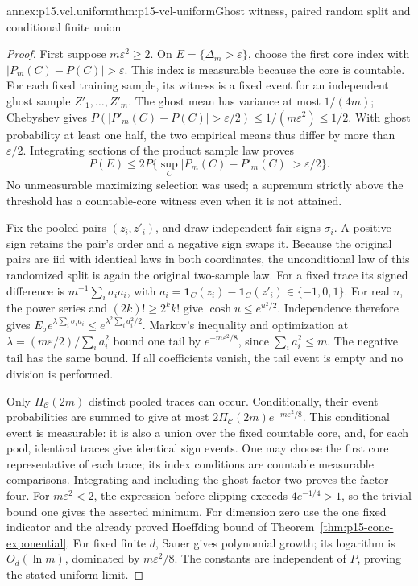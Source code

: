 \begin{annexitem}{annex:p15.vcl.uniform}{thm:p15-vcl-uniform}{Ghost witness, paired random split and conditional finite union}
\begin{proof}
First suppose \(m\varepsilon^2\geq2\). On
\(E=\{\Delta_m>\varepsilon\}\), choose the first core index with
\(|P_m(C)-P(C)|>\varepsilon\). This index is measurable because the
core is countable. For each fixed training sample, its witness is a fixed
event for an independent ghost sample \(Z'_1,\ldots,Z'_m\).
The ghost mean has variance at most \(1/(4m)\); Chebyshev gives
\(P(|P'_m(C)-P(C)|>\varepsilon/2)\leq1/(m\varepsilon^2)\leq1/2\).
With ghost probability at least one half, the two empirical means thus
differ by more than \(\varepsilon/2\). Integrating sections of the product
sample law proves
\[
 P(E)\leq2P\{\sup_C|P_m(C)-P'_m(C)|>\varepsilon/2\}.
\]
No unmeasurable maximizing selection was used; a supremum strictly above
the threshold has a countable-core witness even when it is not attained.

Fix the pooled pairs \((z_i,z'_i)\), and draw independent fair signs
\(\sigma_i\). A positive sign retains the pair's order and a negative
sign swaps it. Because the original pairs are iid with identical laws
in both coordinates, the unconditional law of this randomized split is
again the original two-sample law. For a fixed trace its signed difference
is \(m^{-1}\sum_i\sigma_i a_i\), with
\(a_i=\mathbf1_C(z_i)-\mathbf1_C(z'_i)\in\{-1,0,1\}\).
For real \(u\), the power series and \((2k)!\geq2^kk!\) give
\(\cosh u\leq e^{u^2/2}\). Independence therefore gives
\(E_\sigma e^{\lambda\sum_i\sigma_i a_i}
 \leq e^{\lambda^2\sum_i a_i^2/2}\).
Markov's inequality and optimization at
\(\lambda=(m\varepsilon/2)/\sum_i a_i^2\) bound one tail by
\(e^{-m\varepsilon^2/8}\), since \(\sum_i a_i^2\leq m\).
The negative tail has the same bound. If all coefficients vanish,
the tail event is empty and no division is performed.

Only \(\Pi_{\mathcal C}(2m)\) distinct pooled traces can occur.
Conditionally, their event probabilities are summed to give at most
\(2\Pi_{\mathcal C}(2m)e^{-m\varepsilon^2/8}\).
This conditional event is measurable: it is also a union over the fixed
countable core, and, for each pool, identical traces give identical sign
events. One may choose the first core representative of each trace; its
index conditions are countable measurable comparisons. Integrating and
including the ghost factor two proves the factor four.
For \(m\varepsilon^2<2\), the expression before clipping exceeds
\(4e^{-1/4}>1\), so the trivial bound one gives the asserted minimum.
For dimension zero use the one fixed indicator and the already proved
Hoeffding bound of Theorem~\ref{thm:p15-conc-exponential}.
For fixed finite \(d\), Sauer gives polynomial growth; its logarithm
is \(O_d(\ln m)\), dominated by \(m\varepsilon^2/8\).
The constants are independent of \(P\), proving the stated uniform limit.
\end{proof}
\end{annexitem}

